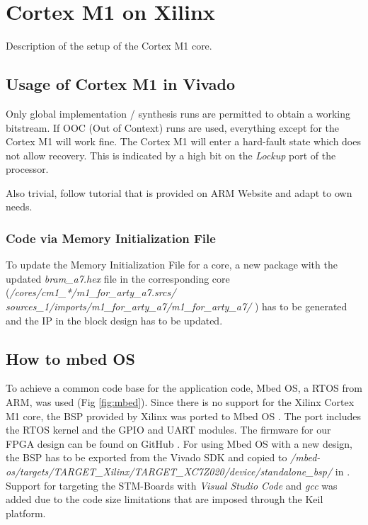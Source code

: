 \chapter{Cortex M1 on Xilinx}

Description of the setup of the Cortex M1 core. \cite{arm_arm_2018} \cite{arm_cortex-m1_nodate}

\section{Usage of Cortex M1 in Vivado}

Only global implementation / synthesis runs are permitted to obtain a working bitstream.
If OOC (Out of Context) runs are used, everything except for the Cortex M1 will work fine. 
The Cortex M1 will enter a hard-fault state which does not allow recovery. 
This is indicated by a high bit on the \textit{Lockup} port of the processor.

Also trivial, follow tutorial that is provided on ARM Website and adapt to own needs.

\subsection{Code via Memory Initialization File}

To update the Memory Initialization File for a core, a new package with the updated \textit{bram\_a7.hex} file in the corresponding core (\textit{/cores/cm1\_*/m1\_for\_arty\_a7.srcs/\\sources\_1/imports/m1\_for\_arty\_a7/m1\_for\_arty\_a7/} \cite{fpga_design}) has to be generated and the \gls{IP} in the block design has to be updated.

\section{How to mbed OS}
To achieve a common code base for the application code, Mbed OS, a \gls{RTOS} from ARM, was used (Fig \ref{fig:mbed}). 
Since there is no support for the Xilinx Cortex M1 core, the \gls{BSP} provided by Xilinx was ported to Mbed OS \cite{mbed_port}. 
The port includes the \gls{RTOS} kernel and the GPIO and UART modules. 
The firmware for our \gls{FPGA} design \cite{fpga_design} can be found on GitHub \cite{firmware}. 
For using Mbed OS with a new design, the \gls{BSP} has to be exported from the Vivado SDK and copied to \textit{/mbed-os/targets/TARGET\_Xilinx/TARGET\_XC7Z020/device/standalone\_bsp/} in \cite{firmware}.
Support for targeting the STM-Boards with \textit{Visual Studio Code} and \textit{gcc} was added due to the code size limitations that are imposed through the Keil platform.

